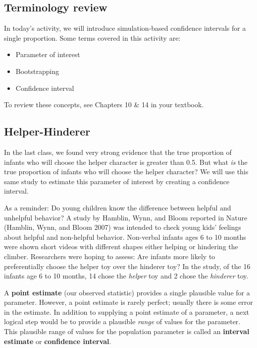 \documentclass[
]{report}
\begin{document}
\hypertarget{terminology-review-9}{%
\subsection{Terminology review}\label{terminology-review-9}}

In today's activity, we will introduce simulation-based confidence intervals for a single proportion. Some terms covered in this activity are:

\begin{itemize}
\item
  Parameter of interest
\item
  Bootstrapping
\item
  Confidence interval
\end{itemize}

To review these concepts, see Chapters 10 \& 14 in your textbook.

\hypertarget{helper-hinderer-2}{%
\subsection{Helper-Hinderer}\label{helper-hinderer-2}}

In the last class, we found very strong evidence that the true proportion of infants who will choose the helper character is greater than 0.5. But what \emph{is} the true proportion of infants who will choose the helper character? We will use this same study to estimate this parameter of interest by creating a confidence interval.

As a reminder: Do young children know the difference between helpful and unhelpful behavior? A study by Hamblin, Wynn, and Bloom reported in Nature (Hamblin, Wynn, and Bloom 2007) was intended to check young kids' feelings about helpful and non-helpful behavior. Non-verbal infants ages 6 to 10 months were shown short videos with different shapes either helping or hindering the climber. Researchers were hoping to assess: Are infants more likely to preferentially choose the helper toy over the hinderer toy? In the study, of the 16 infants age 6 to 10 months, 14 chose the \emph{helper} toy and 2 chose the \emph{hinderer} toy.

A \textbf{point estimate} (our observed statistic) provides a single plausible value for a parameter. However, a point estimate is rarely perfect; usually there is some error in the estimate. In addition to supplying a point estimate of a parameter, a next logical step would be to provide a plausible \emph{range} of values for the parameter. This plausible range of values for the population parameter is called an \textbf{interval estimate} or \textbf{confidence interval}.
\end{document}
